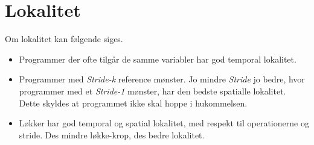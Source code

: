 \section{Lokalitet}
Om lokalitet kan følgende siges.
\begin{itemize}
    \item Programmer der ofte tilgår de samme variabler har god temporal lokalitet.
    \item Programmer med \textit{Stride-k} reference mønster. 
    Jo mindre \textit{Stride} jo bedre, hvor programmer med et \textit{Stride-1} mønster, har den bedste spatialle lokalitet.
    Dette skyldes at programmet ikke skal hoppe i hukommelsen.
    \item Løkker har god temporal og spatial lokalitet, med respekt til operationerne og stride.
    Des mindre løkke-krop, des bedre lokalitet.
\end{itemize}